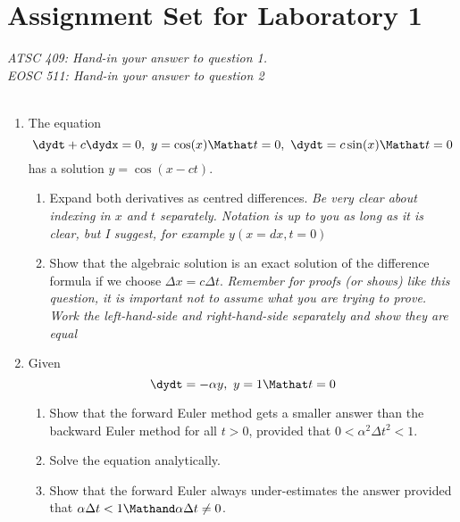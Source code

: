 \documentclass[12pt]{article}
\begin{document}
\section*{Assignment Set for Laboratory 1}
{\it ATSC 409: Hand-in your answer to question 1.\\
EOSC 511: Hand-in your answer to question 2}\\[12pt]

\\[12pt]

\begin{enumerate}
\item The equation
\begin{equation}
\dydt + c \dydx = 0,\ y = \cos(x) \Mathat t=0,\ \dydt = c \sin(x) \Mathat t=0
\end{equation}
has a solution $y=\cos(x-ct)$.
\begin{enumerate}
\item Expand both derivatives as centred differences. {\it Be very
    clear about indexing in $x$ and $t$ separately.  Notation is up to
    you as long as it is clear, but I suggest, for example $y (x=dx, t=0)$}
\item Show that the algebraic solution is an exact solution of the
  difference formula if we choose $\Delta x = c \Delta t$.  {\it
    Remember for proofs (or shows) like this question, it is important
    not to assume what you are trying to prove.  Work the
    left-hand-side and right-hand-side separately and show they are equal}
\end{enumerate}
\item Given
\begin{equation}
\dydt = -\alpha y,\ y = 1 \Mathat t=0
\end{equation}
\begin{enumerate}
\item Show that the forward Euler method gets a smaller answer than
  the backward Euler method for all $t > 0$, provided that $0 <
  \alpha^2 \Delta t^2 < 1$.
\item Solve the equation analytically.
\item Show that the forward Euler always under-estimates the answer provided that $\alpha \Delta t < 1 \Mathand \alpha \Delta t \ne 0$.
\end{enumerate}\end{enumerate}
\end{document}
